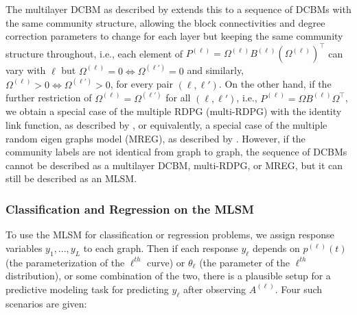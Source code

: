 \documentclass[12pt]{article}
\begin{document}
\begin{example}
The multilayer DCBM as described by \citet{agterberg2022joint} extends this to a sequence of DCBMs with the same community structure, allowing the block connectivities and degree correction parameters to change for each layer but keeping the same community structure throughout, i.e., each element of $P^{(\ell)} = \Omega^{(\ell)} B^{(\ell)} (\Omega^{(\ell)})^\top$ can vary with $\ell$ but $\Omega^{(\ell)} = 0 \iff \Omega^{(\ell')} = 0$ and similarly, $\Omega^{(\ell)} > 0 \iff \Omega^{(\ell')} > 0$, for every pair $(\ell, \ell')$. 
On the other hand, if the further restriction of $\Omega^{(\ell)} = \Omega^{(\ell')}$ for all $(\ell, \ell')$, i.e., $P^{(\ell)} = \Omega B^{(\ell)} \Omega^\top$, we obtain a special case of the multiple RDPG (multi-RDPG) with the identity link function, as described by \citet{nielsen2018multiple}, or equivalently, a special case of the multiple random eigen graphs model (MREG), as described by \citet{8889404}. 
However, if the community labels are not identical from graph to graph, the sequence of DCBMs cannot be described as a multilayer DCBM, multi-RDPG, or MREG, but it can still be described as an MLSM. 
\end{example}

\begin{example}
\end{example}

\hypertarget{classification-and-regression-on-the-mlsm}{%
\subsubsection{Classification and Regression on the
MLSM}\label{classification-and-regression-on-the-mlsm}}

To use the MLSM for classification or regression problems, we assign
response variables \(y_1, ..., y_L\) to each graph. Then if each
response \(y_\ell\) depends on \(p^{(\ell)}(t)\) (the parameterization
of the \(\ell^{th}\) curve) or \(\theta_\ell\) (the parameter of the
\(\ell^{th}\) distribution), or some combination of the two, there is a
plausible setup for a predictive modeling task for predicting \(y_\ell\)
after observing \(A^{(\ell)}\). Four such scenarios are given:
\end{document}
